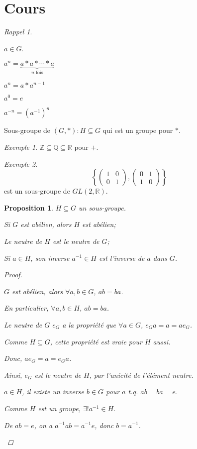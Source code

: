 \documentclass{report}
\newcounter{cours}
\newcommand*{\cours}{\section*{Cours \thecours}\stepcounter{cours}}
\newcommand*{\reels}{\mathbb{R}}
\newcommand*{\entiers}{\mathbb{Z}}
\newcommand*{\rationels}{\mathbb{Q}}
\newtheorem*{prop}{Proposition}
\theoremstyle{definition}
\theoremstyle{remark}
\newtheorem*{exem}{Exemple}
\newtheorem*{rappel}{Rappel}
\begin{document}
	\cours
	\begin{rappel}
		~

		\begin{ulist}[noitemsep]
			\item $a \in G$.
			\begin{ulist}
				\item $a^n=\underbrace{a*a*\dotsb*a}_{\text{$n$ fois}}$
				\item $a^n=a*a^{n-1}$
				\item $a^0=e$
				\item $a^{-n}=(a^{-1})^n$
			\end{ulist}
			\item Sous-groupe de $(G,*):H \subseteq G$ qui est un groupe pour $*$.
			\begin{exem}
				$\entiers \subseteq \rationels \subseteq \reels$ pour $+$.
			\end{exem}
			\begin{exem}
				\[
				\left\lbrace \begin{pmatrix}
					1&0\\0&1
				\end{pmatrix}, \begin{pmatrix}
					0&1\\1&0
				\end{pmatrix} \right\rbrace
				\]
				est un sous-groupe de $GL(2,\reels)$.
			\end{exem}
		\end{ulist}
	\end{rappel}
	\begin{prop}
		$H \subseteq G$ un sous-groupe.
		\begin{nlist}[itemsep=1pt]
			\item Si $G$ est ab\'elien, alors $H$ est ab\'elien;
			\item Le neutre de $H$ est le neutre de $G$;
			\item Si $a \in H$, son inverse $a^{-1}\in H$ est l'inverse de $a$ dans $G$.
		\end{nlist}
		\begin{proof}~

			\begin{nlist}[itemsep=1pt]
				\item $G$ est ab\'elien, alors $\forall a,b \in G$, $ab=ba$.

				En particulier, $\forall a,b \in H$, $ab=ba$.
				\item Le neutre de $G$ $e_G$ a la propri\'et\'e que $\forall a \in G$, $e_Ga=a=ae_G$.

				Comme $H \subseteq G$, cette propri\'et\'e est vraie pour $H$ aussi.

				Donc, $ae_G=a=e_Ga$.

				Ainsi, $e_G$ est le neutre de $H$, par l'unicit\'e de l'\'el\'ement neutre.
				\item $a \in H$, il existe un inverse $b \in G$ pour $a$ t.q. $ab=ba=e$.

				Comme $H$ est un groupe, $\exists! a^{-1} \in H$.

				De $ab=e$, on a $a^{-1}ab=a^{-1}e$, donc $b=a^{-1}$.
			\end{nlist}
		\end{proof}
	\end{prop}
\end{document}
